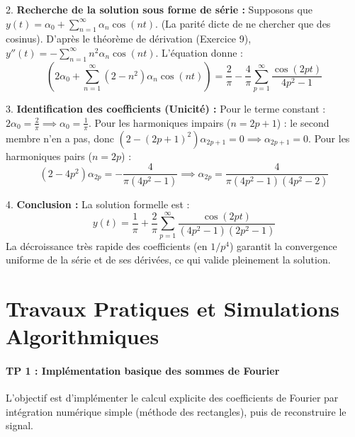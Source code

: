 \documentclass[11pt,a4paper]{article}
\begin{document}
2. \textbf{Recherche de la solution sous forme de série :}
   Supposons que $y(t) = \alpha_0 + \sum_{n=1}^\infty \alpha_n \cos(nt)$. (La parité dicte de ne chercher que des cosinus).
   D'après le théorème de dérivation (Exercice 9), $y''(t) = -\sum_{n=1}^\infty n^2 \alpha_n \cos(nt)$.
   L'équation donne :
   $$ \left( 2\alpha_0 + \sum_{n=1}^\infty (2 - n^2)\alpha_n \cos(nt) \right) = \frac{2}{\pi} - \frac{4}{\pi} \sum_{p=1}^\infty \frac{\cos(2pt)}{4p^2 - 1} $$

3. \textbf{Identification des coefficients (Unicité) :}
   Pour le terme constant : $2\alpha_0 = \frac{2}{\pi} \implies \alpha_0 = \frac{1}{\pi}$.
   Pour les harmoniques impairs ($n=2p+1$) : le second membre n'en a pas, donc $(2 - (2p+1)^2)\alpha_{2p+1} = 0 \implies \alpha_{2p+1} = 0$.
   Pour les harmoniques pairs ($n=2p$) :
   $$ (2 - 4p^2)\alpha_{2p} = -\frac{4}{\pi(4p^2 - 1)} \implies \alpha_{2p} = \frac{4}{\pi(4p^2 - 1)(4p^2 - 2)} $$

4. \textbf{Conclusion :}
   La solution formelle est :
   $$ y(t) = \frac{1}{\pi} + \frac{2}{\pi} \sum_{p=1}^\infty \frac{\cos(2pt)}{(4p^2 - 1)(2p^2 - 1)} $$
   La décroissance très rapide des coefficients (en $1/p^4$) garantit la convergence uniforme de la série et de ses dérivées, ce qui valide pleinement la solution.




\newpage
\part{Travaux Pratiques et Simulations Algorithmiques}
\subsection*{TP 1 : Implémentation basique des sommes de Fourier}

L'objectif est d'implémenter le calcul explicite des coefficients de Fourier par intégration numérique simple (méthode des rectangles), puis de reconstruire le signal.
\end{document}
